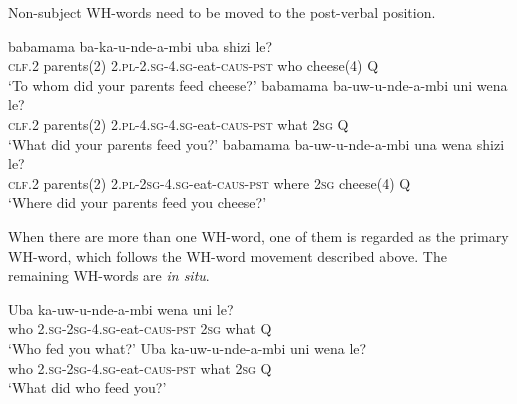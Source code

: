 Non-subject WH-words need to be moved to the post-verbal position.

\begin{exe}
\ex
{} babamama ba-ka-u-nde-\textipa{\textbeltl}a-mbi uba shizi le? \\
\textsc{clf.2} parents(2) \textsc{2.pl}-\textsc{2.sg}-\textsc{4.sg}-eat-\textsc{caus}-\textsc{pst} who cheese(4) Q \\
\trans `To whom did your parents feed cheese?'
\ex
{} babamama ba-uw-u-nde-\textipa{\textbeltl}a-mbi uni wena le? \\
\textsc{clf.2} parents(2) \textsc{2.pl}-\textsc{4.sg}-\textsc{4.sg}-eat-\textsc{caus}-\textsc{pst} what \textsc{2sg} Q \\
\trans `What did your parents feed you?'
\ex
{} babamama ba-uw-u-nde-\textipa{\textbeltl}a-mbi una wena shizi le? \\
\textsc{clf.2} parents(2) \textsc{2.pl}-\textsc{2sg}-\textsc{4.sg}-eat-\textsc{caus}-\textsc{pst} where \textsc{2sg} cheese(4) Q \\
\trans `Where did your parents feed you cheese?'
\end{exe}

When there are more than one WH-word, one of them is regarded as the primary WH-word, which follows the WH-word movement described above. The remaining WH-words are \textit{in situ}.

\begin{exe}
\ex
\begin{xlist}
\ex
\gll Uba ka-uw-u-nde-\textipa{\textbeltl}a-mbi wena uni le? \\
who \textsc{2.sg}-\textsc{2sg}-\textsc{4.sg}-eat-\textsc{caus}-\textsc{pst} \textsc{2sg} what Q \\
\trans `Who fed you what?'
\ex
\gll Uba ka-uw-u-nde-\textipa{\textbeltl}a-mbi uni wena le? \\
who \textsc{2.sg}-\textsc{2sg}-\textsc{4.sg}-eat-\textsc{caus}-\textsc{pst} what \textsc{2sg} Q \\
\trans `What did who feed you?'
\end{xlist}
\end{exe}
